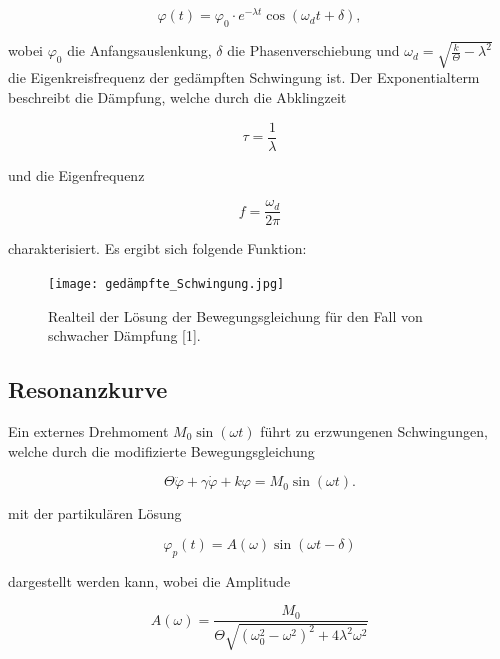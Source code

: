 \documentclass{article}
\begin{document}
\begin{equation}
    \varphi(t) = \varphi_0 \cdot e^{-\lambda t} \cos(\omega_d t + \delta) ,
\end{equation}

wobei $\varphi_0$ die Anfangsauslenkung, $\delta$ die Phasenverschiebung und $\omega_d = \sqrt{\frac{k}{\Theta} - \lambda^2}$ die Eigenkreisfrequenz der gedämpften Schwingung ist. Der Exponentialterm beschreibt die Dämpfung, welche durch die Abklingzeit

\begin{equation}
    \tau = \frac{1}{\lambda}
\end{equation}

und die Eigenfrequenz

\begin{equation}
    f = \frac{\omega_d}{2\pi}
\end{equation}

charakterisiert. Es ergibt sich folgende Funktion:

\begin{figure}[H]
    \centering
    \texttt{[image: gedämpfte\_Schwingung.jpg]}
    \caption{Realteil der Lösung der Bewegungsgleichung für den Fall von schwacher Dämpfung [1].}
    \label{fig:gedämpfte_Schwingung}
\end{figure}



\subsection{Resonanzkurve}
Ein externes Drehmoment $M_0 \sin(\omega t)$ führt zu erzwungenen Schwingungen, welche durch die modifizierte Bewegungsgleichung 

\begin{equation}
    \Theta \ddot{\varphi} + \gamma \dot{\varphi} + k \varphi = M_0 \sin(\omega t).
\end{equation}

mit der partikulären Lösung

\begin{equation}
    \varphi_p (t) = A(\omega) \sin(\omega t - \delta)
\end{equation}

dargestellt werden kann, wobei die Amplitude

\begin{equation}
    A(\omega) = \frac{M_0}{\Theta \sqrt{(\omega_0^2 - \omega^2)^2 + 4\lambda^2 \omega^2}}
\end{equation}
\end{document}
